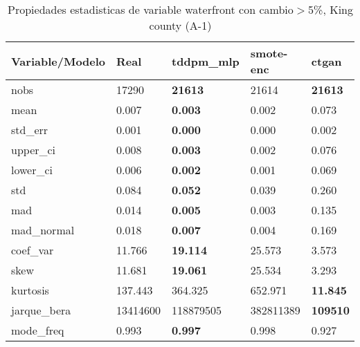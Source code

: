 \begin{table}[H]
\centering
\fontsize{8}{14}\selectfont
\caption{Propiedades estadisticas de variable waterfront con cambio\ensuremath{>}5\%, King county (A-1)}
\label{table-stats-king county-a-1-waterfront-short}
\begin{tabular}{|l|m{10em}|m{10em}|m{10em}|m{10em}|}
\hline
 \rowcolor[gray]{0.8}
Variable/Modelo & Real & tddpm\_mlp & smote-enc & ctgan \\
\hline nobs & 17290 & \bfseries 21613 & \cellcolor[rgb]{0.9, 0.54, 0.52} 21614 & \bfseries 21613 \\
\hline mean & 0.007 & \bfseries 0.003 & 0.002 & \cellcolor[rgb]{0.9, 0.54, 0.52} 0.073 \\
\hline std\_err & 0.001 & \bfseries 0.000 & 0.000 & \cellcolor[rgb]{0.9, 0.54, 0.52} 0.002 \\
\hline upper\_ci & 0.008 & \bfseries 0.003 & 0.002 & \cellcolor[rgb]{0.9, 0.54, 0.52} 0.076 \\
\hline lower\_ci & 0.006 & \bfseries 0.002 & 0.001 & \cellcolor[rgb]{0.9, 0.54, 0.52} 0.069 \\
\hline std & 0.084 & \bfseries 0.052 & 0.039 & \cellcolor[rgb]{0.9, 0.54, 0.52} 0.260 \\
\hline mad & 0.014 & \bfseries 0.005 & 0.003 & \cellcolor[rgb]{0.9, 0.54, 0.52} 0.135 \\
\hline mad\_normal & 0.018 & \bfseries 0.007 & 0.004 & \cellcolor[rgb]{0.9, 0.54, 0.52} 0.169 \\
\hline coef\_var & 11.766 & \bfseries 19.114 & \cellcolor[rgb]{0.9, 0.54, 0.52} 25.573 & 3.573 \\
\hline skew & 11.681 & \bfseries 19.061 & \cellcolor[rgb]{0.9, 0.54, 0.52} 25.534 & 3.293 \\
\hline kurtosis & 137.443 & 364.325 & \cellcolor[rgb]{0.9, 0.54, 0.52} 652.971 & \bfseries 11.845 \\
\hline jarque\_bera & 13414600 & 118879505 & \cellcolor[rgb]{0.9, 0.54, 0.52} 382811389 & \bfseries 109510 \\
\hline mode\_freq & 0.993 & \bfseries 0.997 & 0.998 & \cellcolor[rgb]{0.9, 0.54, 0.52} 0.927 \\
\hline
\end{tabular}
\end{table}

